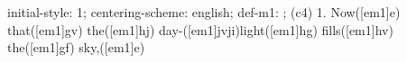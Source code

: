 initial-style: 1;
centering-scheme: english;
def-m1: \grealign;
(c4) 1. Now([em1]e) that([em1]gv) the([em1]hj) day-([em1]jvji)light([em1]hg) fills([em1]hv) the([em1]gf) sky,([em1]e)